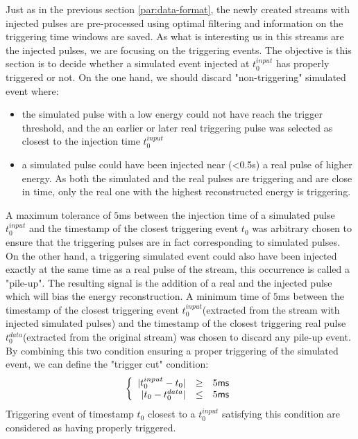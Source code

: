 Just as in the previous section \ref{par:data-format}, the newly created streams with injected pulses are pre-processed using optimal filtering and information on the triggering time windows are saved.
As what is interesting us in this streams are the injected pulses, we are focusing on the triggering events.
The objective is this section is to decide whether a simulated event injected at $t_0^{input}$ has properly triggered or not.
On the one hand, we should discard "non-triggering" simulated event where:
\begin{itemize}
	\item the simulated pulse with a low energy could not have reach the trigger threshold, and the an earlier or later real triggering pulse was selected as closest to the injection time $t_0^{input}$
	\item a simulated pulse could have been injected near (<0.5s) a real pulse of higher energy. As both the simulated and the real pulses are triggering and are close in time, only the real one with the highest reconstructed energy is triggering.
\end{itemize}
A maximum tolerance of $5$ms between the injection time of a simulated pulse $t_0^{input}$ and the timestamp of the closest triggering event $t_0$ was arbitrary chosen to ensure that the triggering pulses are in fact corresponding to simulated pulses.
On the other hand, a triggering simulated event could also have been injected exactly at the same time as a real pulse of the stream, this occurrence is called a "pile-up". The resulting signal is the addition of a real and the injected pulse which will bias the energy reconstruction. A minimum time of $5$ms between the timestamp of the closest triggering event $t_0^{input}$(extracted from the stream with injected simulated pulses) and the timestamp of the closest triggering real pulse $t_0^{data}$(extracted from the original stream) was chosen to discard any pile-up event.
By combining this two condition ensuring a proper triggering of the simulated event, we can define the "trigger cut" condition:
\begin{equation}
\left\{
\begin{array}{r c l}
| t_0^{input} - t_0 | &\geq& 5\textsf{ms}\\
| t_0 - t_0^{data} | &\leq& 5\textsf{ms}
\end{array}
\right.
\end{equation}
Triggering event of timestamp $t_0$ closest to a $t_0^{input}$ satisfying this condition are considered as having properly triggered.

